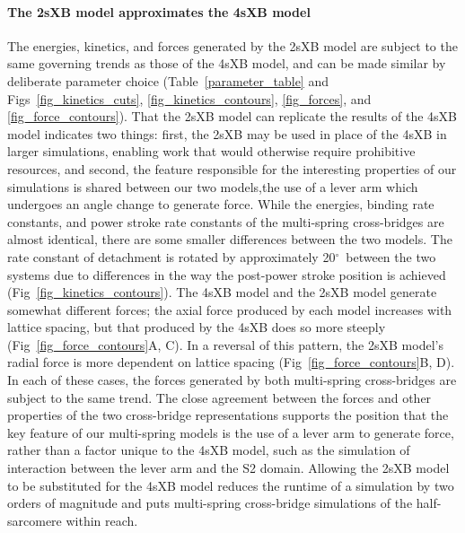 \documentclass[10pt]{article}
\newcommand{\de}{$^\circ$} %
\begin{document}
\paragraph*{The 2sXB model approximates the 4sXB model} %
The energies, kinetics, and forces generated by the 2sXB model are subject to the same governing trends as those of the 4sXB model, and can be made similar by deliberate parameter choice (Table~\ref{parameter_table} and Figs~\ref{fig_kinetics_cuts}, \ref{fig_kinetics_contours}, \ref{fig_forces}, and \ref{fig_force_contours}). 
That the 2sXB model can replicate the results of the 4sXB model indicates two things: first, the 2sXB may be used in place of the 4sXB in larger simulations, enabling work that would otherwise require prohibitive resources, and second, the feature responsible for the interesting properties of our simulations is shared between our two models,the use of a lever arm which undergoes an angle change to generate force. 
While the energies, binding rate constants, and power stroke rate constants of the multi-spring cross-bridges are almost identical, there are some smaller differences between the two models. 
The rate constant of detachment is rotated by approximately 20\de~between the two systems due to differences in the way the post-power stroke position is achieved (Fig~\ref{fig_kinetics_contours}).
The 4sXB model and the 2sXB model generate somewhat different forces; the axial force produced by each model increases with lattice spacing, but that produced by the 4sXB does so more steeply (Fig~\ref{fig_force_contours}A, C). 
In a reversal of this pattern, the 2sXB model's radial force is more dependent on lattice spacing (Fig~\ref{fig_force_contours}B, D).  
In each of these cases, the forces generated by both multi-spring cross-bridges are subject to the same trend.
The close agreement between the forces and other properties of the two cross-bridge representations supports the position that the key feature of our multi-spring models is the use of a lever arm to generate force, rather than a factor unique to the 4sXB model, such as the simulation of interaction between the lever arm and the S2 domain. 
Allowing the 2sXB model to be substituted for the 4sXB model reduces the runtime of a simulation by two orders of magnitude and puts multi-spring cross-bridge simulations of the half-sarcomere within reach.
\end{document}
